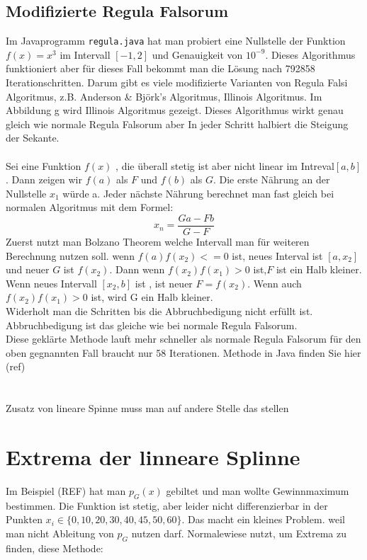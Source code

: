 \subsection{Modifizierte Regula Falsorum}
Im Javaprogramm \verb|regula.java| hat man probiert eine Nullstelle der Funktion $f(x) = x^3$ im Intervall  $[-1,2]$ und Genauigkeit von $10^{-9}$. Dieses Algorithmus funktioniert aber für dieses Fall bekommt man die Lösung nach 792858 Iterationschritten.
Darum gibt es viele modifizierte Varianten von Regula Falsi Algoritmus, z.B. Anderson \& Björk's Algoritmus, Illinois Algoritmus.
Im Abbildung g wird Illinois Algoritmus gezeigt.
Dieses Algorithmus wirkt genau gleich wie normale Regula Falsorum aber In jeder Schritt halbiert die Steigung der Sekante.\\
\\Sei eine Funktion $f(x)$ , die überall stetig ist aber nicht linear im Intreval$[a,b]$. Dann zeigen wir $f(a)$ als $F$ und $f(b)$ als $G$.
Die erste Nährung an der Nullstelle $x_1$ würde a.
Jeder nächste Nährung berechnet man fast gleich bei normalen Algoritmus mit dem Formel:
$$ x_n =\frac{Ga - Fb}{G-F}$$
Zuerst nutzt man Bolzano Theorem welche Intervall  man  für weiteren Berechnung nutzen soll. wenn $f(a)f(x_2)<=0$ ist, neues Interval ist $[a,x_2]$ und neuer $G$ ist $f(x_2)$. Dann wenn $f(x_2)f(x_1) >0$ ist,$ F$ ist ein Halb kleiner.
Wenn neues Intervall $[x_2,b]$ ist , ist neuer $F = f(x_2)$. Wenn auch$ f(x_2)f(x_1)>0$ ist, wird G ein Halb kleiner.\\
Widerholt man die Schritten bis die Abbruchbedigung nicht erfüllt ist. Abbruchbedigung ist das gleiche wie bei normale Regula Falsorum.\\
Diese geklärte Methode lauft mehr schneller als normale Regula Falsorum für den oben gegnannten Fall braucht nur 58 Iterationen.
Methode in Java finden Sie hier (ref)
\\
\\
\\
Zusatz von lineare Spinne  muss man auf andere Stelle das stellen

\section{Extrema der linneare Splinne}
Im Beispiel (REF) hat man $p_G(x)$ gebiltet und man wollte Gewinnmaximum bestimmen. Die Funktion ist stetig, aber leider nicht differenzierbar in der Punkten $ x_i \in \{0, 10, 20 ,30 ,40 ,45 ,50, 60 \}$.
Das macht ein kleines Problem. weil man nicht Ableitung von $p_G$ nutzen darf.
Normalewiese nutzt, um Extrema zu finden, diese Methode:

